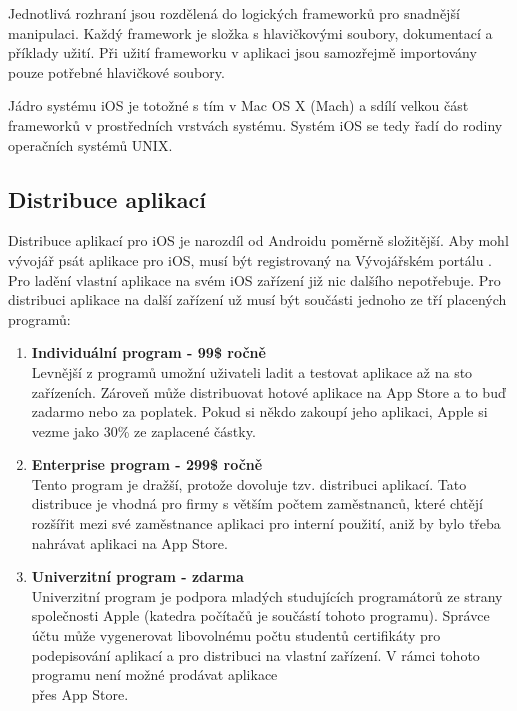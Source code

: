Jednotlivá rozhraní jsou rozdělená do logických frameworků pro snadnější manipulaci. Každý framework je složka s hlavičkovými soubory, dokumentací a příklady užití. Při užití frameworku v aplikaci jsou samozřejmě importovány pouze potřebné hlavičkové soubory.

Jádro systému iOS je totožné s tím v Mac OS X (Mach) a sdílí velkou část frameworků v prostředních vrstvách systému. Systém iOS se tedy řadí do rodiny operačních systémů UNIX.
\newpage

\subsection{Distribuce aplikací}
Distribuce aplikací pro iOS je narozdíl od Androidu poměrně složitější. Aby mohl vývojář psát aplikace pro iOS, musí být registrovaný na Vývojářském portálu \cite{DEVPORT}. Pro ladění vlastní aplikace na svém iOS zařízení již nic dalšího nepotřebuje. Pro distribuci aplikace na další zařízení už musí být součásti jednoho ze tří placených programů:

\begin{enumerate}
\item {\bf Individuální program - 99\$ ročně}\\
Levnější z programů umožní uživateli ladit a testovat aplikace až na sto zařízeních. Zároveň může distribuovat hotové aplikace na App Store a to buď zadarmo nebo za poplatek. Pokud si někdo zakoupí jeho aplikaci, Apple si vezme jako  30\% ze zaplacené částky.

\item {\bf Enterprise program - 299\$ ročně}\\
Tento program je dražší, protože dovoluje tzv.  distribuci aplikací. Tato distribuce je vhodná pro firmy s větším počtem zaměstnanců, které chtějí rozšířit mezi své zaměstnance aplikaci pro interní použití, aniž by bylo třeba nahrávat aplikaci na App Store.

\item {\bf Univerzitní program - zdarma}\\
Univerzitní program je podpora mladých studujících programátorů ze strany společnosti Apple (katedra počítačů je součástí tohoto programu). Správce účtu může vygenerovat libovolnému počtu studentů certifikáty pro podepisování aplikací a pro distribuci na vlastní zařízení. V rámci tohoto programu není možné prodávat aplikace \\přes App Store.
\end{enumerate}

